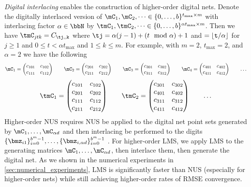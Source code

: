 \documentclass[acmsmall]{acmart}
\begin{document}
\emph{Digital interlacing} enables the construction of higher-order digital nets. Denote the digitally interlaced version of $\mC_1,\mC_2,\dots \in \{0,\dots,b\}^{t_\mathrm{max} \times m}$ with interlacing factor $\alpha \in \bbN$ by $\tmC_1,\tmC_2,\dots \in \{0,\dots,b\}^{\alpha t_\mathrm{max} \times m}$. Then we have $\tmC_{jtk} = C_{\tj,\tt,k}$ where $\tj = \alpha (j-1) + (t \mod \alpha) + 1$ and $\tt = \lfloor t / \alpha \rfloor$ for $j \geq 1$ and $0 \leq t < \alpha t_\mathrm{max}$ and $1 \leq k \leq m$. For example, with $m=2$, $t_\mathrm{max}=2$, and $\alpha=2$ we have the following 
$$\mC_1 = \begin{pmatrix} c_{101} & c_{102} \\ c_{111} & c_{112} \end{pmatrix} \qquad \mC_2 = \begin{pmatrix} c_{201} & c_{202} \\ c_{211} & c_{212} \end{pmatrix} \qquad \mC_3 = \begin{pmatrix} c_{301} & c_{302} \\ c_{311} & c_{312} \end{pmatrix} \qquad \mC_4 = \begin{pmatrix} c_{401} & c_{402} \\ c_{411} & c_{412} \end{pmatrix} \qquad \dots$$
$$\tmC_1 = \begin{pmatrix} c_{101} & c_{102} \\ c_{201} & c_{202} \\ c_{111} & c_{112} \\ c_{211} & c_{212} \end{pmatrix} \qquad \tmC_2 = \begin{pmatrix} c_{301} & c_{302} \\ c_{401} & c_{402} \\ c_{311} & c_{312} \\ c_{411} & c_{412}\end{pmatrix} \qquad \dots$$
Higher-order NUS requires NUS be applied to the digital net point sets generated by $\mC_1,\dots,\mC_{\alpha d}$ and then interlacing be performed to the digits $\{\bmz_{i1}\}_{i=0}^{b^m-1},\dots,\{\bmz_{i,\alpha d}\}_{i=0}^{b^m-1}$ \citep{dick.higher_order_scrambled_digital_nets}. For higher-order LMS, we apply LMS to the generating matrices $\mC_1,\dots,\mC_{\alpha d}$, then interlace them, then generate the digital net. As we shown in the numerical experiments in \cref{sec:numerical_experiments}, LMS is significantly faster than NUS (especially for higher-order nets) while still achieving higher-order rates of RMSE convergence. 
\end{document}
